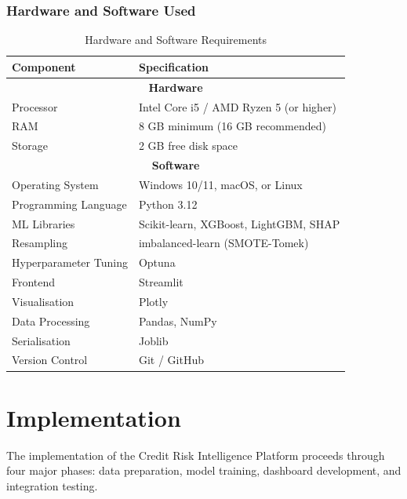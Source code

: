 \documentclass[12pt,a4paper]{report}
\begin{document}
\subsection{Hardware and Software Used}

\begin{table}[H]
\centering
\caption{Hardware and Software Requirements}\label{tab:hwsw}
\begin{tabular}{|l|l|}
\hline
\rowcolor{headercolor}
\color{white}\textbf{Component} & \color{white}\textbf{Specification} \\
\hline
\multicolumn{2}{|c|}{\textbf{Hardware}} \\
\hline
Processor & Intel Core i5 / AMD Ryzen 5 (or higher) \\
\hline
RAM & 8 GB minimum (16 GB recommended) \\
\hline
Storage & 2 GB free disk space \\
\hline
\multicolumn{2}{|c|}{\textbf{Software}} \\
\hline
Operating System & Windows 10/11, macOS, or Linux \\
\hline
Programming Language & Python 3.12 \\
\hline
ML Libraries & Scikit-learn, XGBoost, LightGBM, SHAP \\
\hline
Resampling & imbalanced-learn (SMOTE-Tomek) \\
\hline
Hyperparameter Tuning & Optuna \\
\hline
Frontend & Streamlit \\
\hline
Visualisation & Plotly \\
\hline
Data Processing & Pandas, NumPy \\
\hline
Serialisation & Joblib \\
\hline
Version Control & Git / GitHub \\
\hline
\end{tabular}
\end{table}


\chapter{Implementation}

The implementation of the Credit Risk Intelligence Platform proceeds through four major phases: data preparation, model training, dashboard development, and integration testing.
\end{document}
